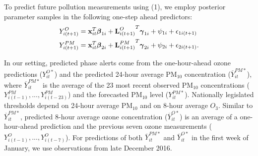 \documentclass[alpha-refs]{wiley-article}
\newcommand{\bbeta}{ \mbox{\boldmath $ \beta $} }
\newcommand{\bgamma}{ \mbox{\boldmath $\gamma$} }
\newcommand{\bL}{\textbf{L}}
\newcommand{\bx}{\textbf{x}}
\begin{document}

To predict future pollution measurements using (1), we employ posterior parameter samples in the following one-step ahead predictors:
\begin{align}\label{eq:mod3a_one}
Y^{O}_{i(t+1)} &= \bx_{it}^T \bbeta_{1i} + {\bL^O_{i(t+1)}}^T\bgamma_{1i}+ \psi_{1i}  + \epsilon_{1i(t+1)} \\
Y^{PM}_{i(t+1)} &= \bx_{it}^T \bbeta_{2i}+ {\bL^{PM}_{i(t+1)}}^T\bgamma_{2i} + \psi_{2i}  + \epsilon_{2i(t+1)}.\nonumber
\end{align}

In our setting, predicted phase alerts come from the one-hour-ahead ozone predictions (${Y}_{it}^{O*}$) and the predicted 24-hour average $\text{PM}_{10}$ concentration (${\overline{Y}_{it}^{PM*}}$), where ${\overline{Y}_{it}^{PM*}}$ is the average of the 23 most recent observed $\text{PM}_{10}$ concentrations ($Y_{i(t-1)}^{PM},...,Y_{i(t-23)}^{PM}$) and the forecasted $\text{PM}_{10}$ level (${Y}_{it}^{PM*}$). Nationally legislated thresholds depend on 24-hour average $\text{PM}_{10}$ and on 8-hour average $O_3$. Similar to ${\overline{Y}_{it}^{PM*}}$, predicted 8-hour average ozone concentration (${\overline{Y}_{it}^{O*}}$) is an average of a one-hour-ahead prediction and the previous seven ozone measurements ($Y_{i(t-1)}^{O},...,Y_{i(t-7)}^{O}$). For predictions of both ${\overline{Y}_{it}^{PM*}}$ and ${\overline{Y}_{it}^{O*}}$ in the first week of January,  we use observations from late December 2016.
\end{document}
